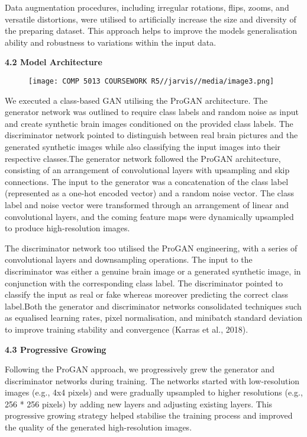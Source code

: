 \documentclass[
]{article}
\begin{document}
Data augmentation procedures, including irregular rotations, flips,
zooms, and versatile distortions, were utilised to artificially increase
the size and diversity of the preparing dataset. This approach helps to
improve the model\textquotesingle s generalisation ability and
robustness to variations within the input data.

\textbf{4.2 Model Architecture}

\begin{figure}
    \centering
    \texttt{[image: COMP 5013 COURSEWORK R5//jarvis//media/image3.png]}


\end{figure}

We executed a class-based GAN utilising the ProGAN architecture. The
generator network was outlined to require class labels and random noise
as input and create synthetic brain images conditioned on the provided
class labels. The discriminator network pointed to distinguish between
real brain pictures and the generated synthetic images while also
classifying the input images into their respective classes.The generator
network followed the ProGAN architecture, consisting of an arrangement
of convolutional layers with upsampling and skip connections. The input
to the generator was a concatenation of the class label (represented as
a one-hot encoded vector) and a random noise vector. The class label and
noise vector were transformed through an arrangement of linear and
convolutional layers, and the coming feature maps were dynamically
upsampled to produce high-resolution images.

The discriminator network too utilised the ProGAN engineering, with a
series of convolutional layers and downsampling operations. The input to
the discriminator was either a genuine brain image or a generated
synthetic image, in conjunction with the corresponding class label. The
discriminator pointed to classify the input as real or fake whereas
moreover predicting the correct class label.Both the generator and
discriminator networks consolidated techniques such as equalised
learning rates, pixel normalisation, and minibatch standard deviation to
improve training stability and convergence (Karras et al., 2018).

\textbf{4.3 Progressive Growing}

Following the ProGAN approach, we progressively grew the generator and
discriminator networks during training. The networks started with
low-resolution images (e.g., 4x4 pixels) and were gradually upsampled to
higher resolutions (e.g., 256 * 256 pixels) by adding new layers and
adjusting existing layers. This progressive growing strategy helped
stabilise the training process and improved the quality of the generated
high-resolution images.
\end{document}
